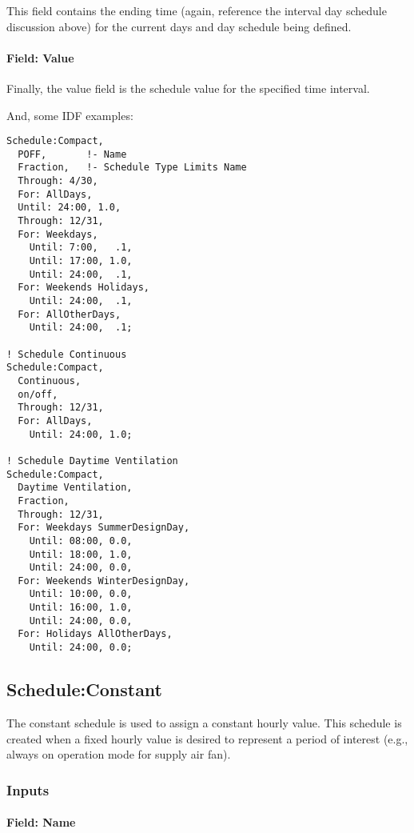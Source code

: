 This field contains the ending time (again, reference the interval day schedule discussion above) for the current days and day schedule being defined.

\paragraph{Field: Value}\label{field-value-1}

Finally, the value field is the schedule value for the specified time interval.

And, some IDF examples:

\begin{lstlisting}
Schedule:Compact,
  POFF,       !- Name
  Fraction,   !- Schedule Type Limits Name
  Through: 4/30,
  For: AllDays,
  Until: 24:00, 1.0,
  Through: 12/31,
  For: Weekdays,
    Until: 7:00,   .1,
    Until: 17:00, 1.0,
    Until: 24:00,  .1,
  For: Weekends Holidays,
    Until: 24:00,  .1,
  For: AllOtherDays,
    Until: 24:00,  .1;

! Schedule Continuous
Schedule:Compact,
  Continuous,
  on/off,
  Through: 12/31,
  For: AllDays,
    Until: 24:00, 1.0;

! Schedule Daytime Ventilation
Schedule:Compact,
  Daytime Ventilation,
  Fraction,
  Through: 12/31,
  For: Weekdays SummerDesignDay,
    Until: 08:00, 0.0,
    Until: 18:00, 1.0,
    Until: 24:00, 0.0,
  For: Weekends WinterDesignDay,
    Until: 10:00, 0.0,
    Until: 16:00, 1.0,
    Until: 24:00, 0.0,
  For: Holidays AllOtherDays,
    Until: 24:00, 0.0;
\end{lstlisting}

\subsection{Schedule:Constant}\label{scheduleconstant}

The constant schedule is used to assign a constant hourly value. This schedule is created when a fixed hourly value is desired to represent a period of interest (e.g., always on operation mode for supply air fan).

\subsubsection{Inputs}\label{inputs-8-021}

\paragraph{Field: Name}\label{field-name-7-018}

